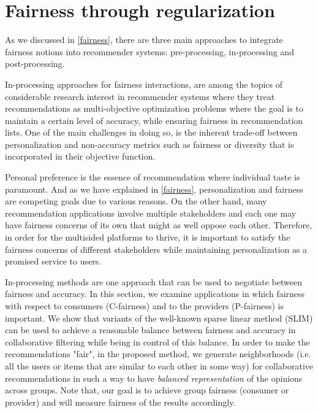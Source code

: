 \chapter{Fairness through regularization}
\label{fairness_inproc}



As we discussed in \ref{fairness}, there are three main approaches to integrate fairness notions into recommender systems: pre-processing, in-processing and post-processing.

In-processing approaches for fairness interactions, are among the topics of considerable research interest in recommender systems where they treat recommendations as multi-objective optimization problems where the goal is to maintain a certain level of accuracy, while ensuring fairness in recommendation lists. One of the main challenges in doing so, is the inherent trade-off between personalization and non-accuracy metrics such as fairness or diversity that is incorporated in their objective function.

Personal preference is the essence of recommendation where individual taste is paramount. And as we have explained in \ref{fairness}, personalization and fairness are competing goals due to various reasons. On the other hand, many recommendation applications involve multiple stakeholders and each one may have fairness concerns of its own that might as well oppose each other. Therefore, in order for the multisided platforms to thrive, it is important to satisfy the fairness concerns of different stakeholders while maintaining personalization as a promised service to users.

In-processing methods are one approach that can be used to negotiate between fairness and accuracy. In this section, we examine applications in which fairness with respect to consumers (C-fairness) and to the providers (P-fairness) is important. We show that variants of the well-known sparse linear method (SLIM) can be used to achieve a reasonable balance between fairness and accuracy in collaborative filtering while being in control of this balance. In order to make the recommendations "fair", in the proposed method, we generate neighborhoods (i.e. all the users or items that are similar to each other in some way) for collaborative recommendations in such a way to have \textit{balanced representation} of the opinions across groups. Note that, our goal is to achieve group fairness (consumer or provider) and will measure fairness of the results accordingly.

